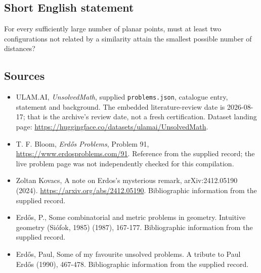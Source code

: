 \documentclass[11pt,a4paper]{article}
\begin{document}
\subsection{Short English statement}

For every sufficiently large number of planar points, must at least two configurations not related by a similarity attain the smallest possible number of distances?

\subsection{Sources}

{\small

\begin{itemize}

\item[\hypertarget{source:statement:1}{S1}] ULAM.AI, \emph{UnsolvedMath}, supplied \texttt{problems.json}, catalogue entry, statement and background. The embedded literature-review date is 2026-08-17; that is the archive’s review date, not a fresh certification. Dataset landing page: \url{https://huggingface.co/datasets/ulamai/UnsolvedMath}.

\item[\hypertarget{source:statement:2}{S2}] T. F. Bloom, \emph{Erdős Problems}, Problem 91, \url{https://www.erdosproblems.com/91}. Reference from the supplied record; the live problem page was not independently checked for this compilation.

\item[\hypertarget{source:statement:3}{S3}] Zoltan Kovacs, A note on Erdos's mysterious remark, arXiv:2412.05190 (2024). \url{https://arxiv.org/abs/2412.05190}. Bibliographic information from the supplied record.

\item[\hypertarget{source:statement:4}{S4}] Erd\H{o}s, P., Some combinatorial and metric problems in geometry. Intuitive geometry (Si\'{o}fok, 1985) (1987), 167-177. Bibliographic information from the supplied record.

\item[\hypertarget{source:statement:5}{S5}] Erd\H{o}s, Paul, Some of my favourite unsolved problems. A tribute to Paul Erd\H{o}s (1990), 467-478. Bibliographic information from the supplied record.

\end{itemize}

}

\label{end:statement}
\end{document}

